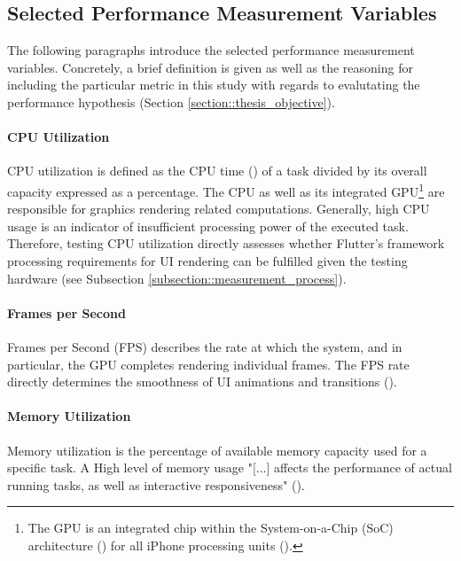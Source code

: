 \subsection{Selected Performance Measurement Variables} \label{subsection::selected_measurement_variables}
The following paragraphs introduce the selected performance measurement variables. Concretely,
a brief definition is given as well as the reasoning for including the particular metric in
this study with regards to evalutating the performance hypothesis (Section \ref{section::thesis_objective}).

\paragraph*{CPU Utilization}\hfill \break
CPU utilization is defined as the CPU time (\cite{FSF1988}) of a task
divided by its overall capacity expressed as a percentage. The CPU as well as its integrated GPU\footnote{The GPU is an integrated chip within the System-on-a-Chip (SoC) architecture (\cite{Martin2001}) for all
iPhone processing units (\cite{WikiChip2020}).}
are responsible for graphics rendering related computations. Generally, high CPU usage is an
indicator of insufficient processing power of the executed task. Therefore, testing CPU utilization
directly assesses whether Flutter’s framework processing requirements for UI rendering can be
fulfilled given the testing hardware (see Subsection \ref{subsection::measurement_process}).

\paragraph*{Frames per Second}\hfill \break
Frames per Second (FPS) describes the rate at which the system, and in particular, the GPU
completes rendering individual frames. The FPS rate directly determines the smoothness of UI
animations and transitions (\cite{Google2020}).

\paragraph*{Memory Utilization}\hfill \break
Memory utilization is the percentage of available memory capacity used for a specific task. A
High level of memory usage "[...] affects the performance of actual running tasks, as well as
interactive responsiveness" (\cite{Ljubuncic2015}).

